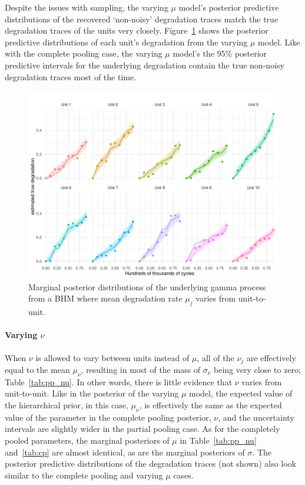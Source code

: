 Despite the issues with sampling, the varying $\mu$ model's posterior predictive distributions of the recovered `non-noisy' degradation traces match the true degradation traces of the units very closely. Figure~\ref{fig:pp_mu_filtered} shows the posterior predictive distributions of each unit's degradation from the varying $\mu$ model. Like with the complete pooling case, the varying $\mu$ model's the 95\% posterior predictive intervals for the underlying degradation contain the true non-noisy degradation traces most of the time.

\begin{figure}
   \centering
   \includegraphics[width=0.8\columnwidth]{./figures/ch-5/plot-pp-mu-filtered.pdf}
   \caption{Marginal posterior distributions of the underlying gamma process from a BHM where mean degradation rate $\mu_j$ varies from unit-to-unit.}
   \label{fig:pp_mu_filtered}
\end{figure}

\paragraph{Varying $\nu$} When $\nu$ is allowed to vary between units instead of $\mu$, all of the $\nu_j$ are effectively equal to the mean $\mu_\nu$, resulting in most of the mass of $\sigma_\nu$ being very close to zero; Table~\ref{tab:pp_nu}. In other words, there is little evidence that $\nu$ varies from unit-to-unit. Like in the posterior of the varying $\mu$ model, the expected value of the hierarchical prior, in this case, $\mu_\nu$, is effectively the same as the expected value of the parameter in the complete pooling posterior, $\nu$, and the uncertainty intervals are slightly wider in the partial pooling case. As for the completely pooled parameters, the marginal posteriors of $\mu$ in Table~\ref{tab:pp_nu} and~\ref{tab:cp} are almost identical, as are the marginal posteriors of $\sigma$. The posterior predictive distributions of the degradation traces (not shown) also look similar to the complete pooling and varying $\mu$ cases.

